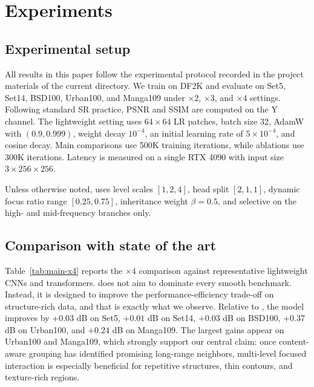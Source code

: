 \section{Experiments}
\label{sec:experiments}

\subsection{Experimental setup}
All results in this paper follow the experimental protocol recorded in the project materials of the current directory. We train on DF2K and evaluate on Set5, Set14, BSD100, Urban100, and Manga109 under \(\times2\), \(\times3\), and \(\times4\) settings. Following standard SR practice, PSNR and SSIM are computed on the Y channel. The lightweight setting uses \(64\times64\) LR patches, batch size 32, AdamW with \((0.9, 0.999)\), weight decay \(10^{-4}\), an initial learning rate of \(5\times10^{-4}\), and cosine decay. Main comparisons use 500K training iterations, while ablations use 300K iterations. Latency is measured on a single RTX 4090 with input size \(3\times256\times256\).

Unless otherwise noted, \method{} uses level scales \([1,2,4]\), head split \([2,1,1]\), dynamic focus ratio range \([0.25, 0.75]\), inheritance weight \(\beta=0.5\), and selective \irca{} on the high- and mid-frequency branches only.

\subsection{Comparison with state of the art}
Table~\ref{tab:main-x4} reports the \(\times4\) comparison against representative lightweight CNNs and transformers. \method{} does not aim to dominate every smooth benchmark. Instead, it is designed to improve the performance-efficiency trade-off on structure-rich data, and that is exactly what we observe. Relative to \baseline{}, the model improves by \(+0.03\) dB on Set5, \(+0.01\) dB on Set14, \(+0.03\) dB on BSD100, \(+0.37\) dB on Urban100, and \(+0.24\) dB on Manga109. The largest gains appear on Urban100 and Manga109, which strongly support our central claim: once content-aware grouping has identified promising long-range neighbors, multi-level focused interaction is especially beneficial for repetitive structures, thin contours, and texture-rich regions.


